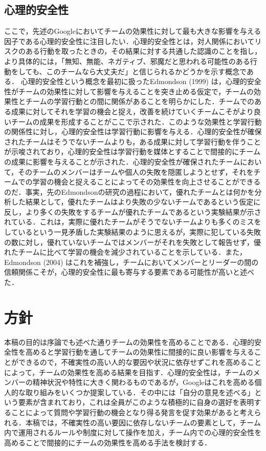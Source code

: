 \documentclass[a4paper, 11pt]{jsarticle}
\begin{document}
\subsection{心理的安全性}
ここで，先述のGoogle\cite{Google}においてチームの効果性に対して最も大きな影響を与える因子である心理的安全性に注目したい．心理的安全性とは，対人関係においてリスクのある行動を取ったときの，その結果に対する共通した認識のことを指し，より具体的には，「無知、無能、ネガティブ、邪魔だと思われる可能性のある行動をしても、このチームなら大丈夫だ」と信じられるかどうかを示す概念である．
心理的安全性という概念を最初に扱ったEdmondson (1999) \cite{Edmondson}は，心理的安全性がチームの効果性に対して影響を与えることを突き止める仮定で，チームの効果性とチームの学習行動との間に関係があることを明らかにした．チームでのある成果に対してそれを学習の機会と捉え，改善を続けていくチームこそがより良いチームの成果を形成することがここで示された．このような効果性と学習行動の関係性に対し，心理的安全性は学習行動に影響を与える．心理的安全性が確保されたチームはそうでないチームよりも，ある成果に対して学習行動を伴うことが示唆されており，心理的安全性は学習行動を媒体とすることで間接的にチームの成果に影響を与えることが示された．心理的安全性が確保されたチームにおいて，そのチームのメンバーはチームや個人の失敗を隠匿しようとせず，それをチームでの学習の機会と捉えることによってその効果性を向上させることができるのだ．事実，先のEdmondsonの研究\cite{Edmondson}の過程において，優れたチームとは何かを分析した結果として，優れたチームはより失敗の少ないチームであるという仮定に反し，より多くの失敗をするチームが優れたチームであるという実験結果が示されている．これは，実際に優れたチームがそうでないチームよりも多くのミスをしているという一見矛盾した実験結果のように思えるが，実際に犯している失敗の数に対し，優れていないチームではメンバーがそれを失敗として報告せず，優れたチームに比べて学習の機会を減少されていることを示している．また，Edmondson (2004) \cite{Russell}はこれを補強し，チームにおいてメンバーとリーダーの間の信頼関係こそが，心理的安全性に最も寄与する要素である可能性が高いと述べた．

\section{方針}
本稿の目的は序論でも述べた通りチームの効果性を高めることである．心理的安全性を高めると学習行動を通してチームの効果性に間接的に良い影響を与えることができるので，不確実性の高い人的な要因や状況に依存せずこれを高めることによって，チームの効果性を高める結果を目指す．心理的安全性は，チームのメンバーの精神状況や特性に大きく関わるものであるが，Google\cite{GoogleDoc}はこれを高める個人的な取り組みをいくつか提案している．その中には「自分の意見を述べる」という要素が含まれており，これは全員がこのような積極的に自身の選好を表明することによって質問や学習行動の機会となり得る発言を促す効果があると考えられる．本稿では，不確実性の高い要因に依存しないチームの要素として，チーム内で運用されるルールや制度に対して操作を加え，チーム内での心理的安全性を高めることで間接的にチームの効果性を高める手法を検討する．
\end{document}
